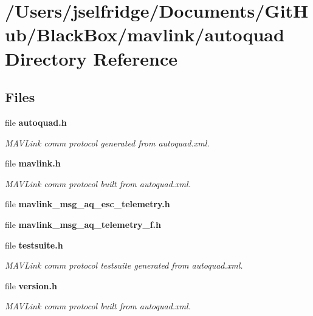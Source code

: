 \section{/\+Users/jselfridge/\+Documents/\+Git\+Hub/\+Black\+Box/mavlink/autoquad Directory Reference}
\label{dir_9c20d83486fbc63eeb3ec42e80142c21}
\subsection*{Files}
\begin{DoxyCompactItemize}
\item 
file \textbf{ autoquad.\+h}
\begin{DoxyCompactList}\small\item\em M\+A\+V\+Link comm protocol generated from autoquad.\+xml. \end{DoxyCompactList}\item 
file \textbf{ mavlink.\+h}
\begin{DoxyCompactList}\small\item\em M\+A\+V\+Link comm protocol built from autoquad.\+xml. \end{DoxyCompactList}\item 
file \textbf{ mavlink\+\_\+msg\+\_\+aq\+\_\+esc\+\_\+telemetry.\+h}
\item 
file \textbf{ mavlink\+\_\+msg\+\_\+aq\+\_\+telemetry\+\_\+f.\+h}
\item 
file \textbf{ testsuite.\+h}
\begin{DoxyCompactList}\small\item\em M\+A\+V\+Link comm protocol testsuite generated from autoquad.\+xml. \end{DoxyCompactList}\item 
file \textbf{ version.\+h}
\begin{DoxyCompactList}\small\item\em M\+A\+V\+Link comm protocol built from autoquad.\+xml. \end{DoxyCompactList}\end{DoxyCompactItemize}
